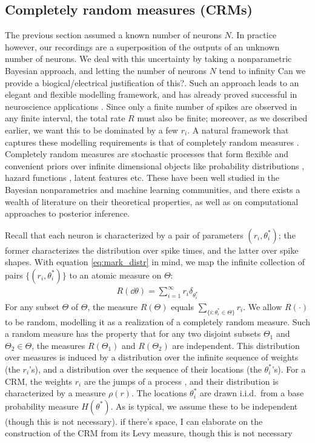 \subsection{Completely random measures (CRMs)}
The previous section assumed a known number of neurons $N$. In practice however, our recordings are a superposition of the outputs of an unknown
number of neurons. We deal with this uncertainty by taking a nonparametric Bayesian approach, and letting the number of neurons $N$ tend to infinity
{\color{red} Can we provide a biogical/electrical justification of this?}. 
Such an approach leads to an elegant and flexible modelling framework, and has  already proved successful in neuroscience applications
\citep{WoodBla2008}.
Since only a finite number of spikes are observed in any finite interval, the total rate $R$ must 
also be finite; moreover, as we described earlier, we want this to be dominated by a few $r_i$. 
A natural framework that captures these  modelling requirements is that of completely random measures \citep{Kingman:PJM67}.
Completely random measures are stochastic processes that form flexible and convenient priors over
infinite dimensional objects like probability distributions \citep{JamesLP09}, hazard functions \citep{Hjo1990}, latent features \citep{ThiJor2007} etc. 
These have been well studied in the Bayesian nonparametrics and machine learning communities, and there exists a wealth of literature on
their theoretical properties, as well as on computational approaches to posterior inference.

Recall that each neuron is characterized by a pair of parameters $(r_i, \theta^*_i)$; the former characterizes the distribution over spike times, 
and the latter over spike
shapes. With equation \eqref{eq:mark_distr} in mind, we map the infinite collection of pairs $\{(r_i, \theta^*_i)\}$ to an atomic measure on $\Theta$:
\begin{align}
  R(\dd \theta) = \sum_{i=1}^{\infty} r_i \delta_{\theta^*_i}
\end{align}
For any subset $\varTheta$ of $\Theta$, the measure $R(\varTheta)$ equals \( \sum_{\{ i: \theta^*_i \in \varTheta \} } r_i\). We allow $R(\cdot)$ to be random,
modelling it as a realization of a completely random measure. Such a random measure has the property that for any two disjoint subsets $\varTheta_1$ 
and $\varTheta_2 \in \Theta$, the measures $R(\varTheta_1)$ and $R(\varTheta_2)$ are independent. 
This distribution over measures is induced by a distribution
over the infinite sequence of weights (the $r_i$'s), and a distribution over the sequence of their locations (the $\theta^*_i$'s). 
For a CRM, the weights $r_i$ are the jumps of a \Levy process \citep{Sato90}, and their distribution is characterized by a 
\Levy measure $\rho(r)$. The locations $\theta^*_i$ are drawn i.i.d.\  from a base probability measure $H(\theta^*)$.
As is typical, we assume these to be independent (though this is not necessary). {\color{red} if there's space, I
can elaborate on the construction of the CRM from its Levy measure, though this is not necessary}

